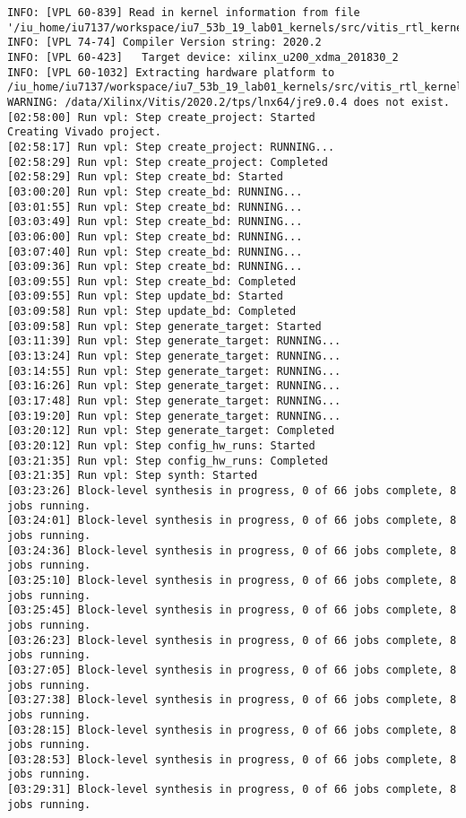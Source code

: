 \begin{center}
\begin{lstlisting}[label=lst:vlog,caption=Файл v++\_vinc.log]
INFO: [VPL 60-839] Read in kernel information from file '/iu_home/iu7137/workspace/iu7_53b_19_lab01_kernels/src/vitis_rtl_kernel/rtl_kernel_wizard_1/_x/link/int/kernel_info.dat'.
INFO: [VPL 74-74] Compiler Version string: 2020.2
INFO: [VPL 60-423]   Target device: xilinx_u200_xdma_201830_2
INFO: [VPL 60-1032] Extracting hardware platform to /iu_home/iu7137/workspace/iu7_53b_19_lab01_kernels/src/vitis_rtl_kernel/rtl_kernel_wizard_1/_x/link/vivado/vpl/.local/hw_platform
WARNING: /data/Xilinx/Vitis/2020.2/tps/lnx64/jre9.0.4 does not exist.
[02:58:00] Run vpl: Step create_project: Started
Creating Vivado project.
[02:58:17] Run vpl: Step create_project: RUNNING...
[02:58:29] Run vpl: Step create_project: Completed
[02:58:29] Run vpl: Step create_bd: Started
[03:00:20] Run vpl: Step create_bd: RUNNING...
[03:01:55] Run vpl: Step create_bd: RUNNING...
[03:03:49] Run vpl: Step create_bd: RUNNING...
[03:06:00] Run vpl: Step create_bd: RUNNING...
[03:07:40] Run vpl: Step create_bd: RUNNING...
[03:09:36] Run vpl: Step create_bd: RUNNING...
[03:09:55] Run vpl: Step create_bd: Completed
[03:09:55] Run vpl: Step update_bd: Started
[03:09:58] Run vpl: Step update_bd: Completed
[03:09:58] Run vpl: Step generate_target: Started
[03:11:39] Run vpl: Step generate_target: RUNNING...
[03:13:24] Run vpl: Step generate_target: RUNNING...
[03:14:55] Run vpl: Step generate_target: RUNNING...
[03:16:26] Run vpl: Step generate_target: RUNNING...
[03:17:48] Run vpl: Step generate_target: RUNNING...
[03:19:20] Run vpl: Step generate_target: RUNNING...
[03:20:12] Run vpl: Step generate_target: Completed
[03:20:12] Run vpl: Step config_hw_runs: Started
[03:21:35] Run vpl: Step config_hw_runs: Completed
[03:21:35] Run vpl: Step synth: Started
[03:23:26] Block-level synthesis in progress, 0 of 66 jobs complete, 8 jobs running.
[03:24:01] Block-level synthesis in progress, 0 of 66 jobs complete, 8 jobs running.
[03:24:36] Block-level synthesis in progress, 0 of 66 jobs complete, 8 jobs running.
[03:25:10] Block-level synthesis in progress, 0 of 66 jobs complete, 8 jobs running.
[03:25:45] Block-level synthesis in progress, 0 of 66 jobs complete, 8 jobs running.
[03:26:23] Block-level synthesis in progress, 0 of 66 jobs complete, 8 jobs running.
[03:27:05] Block-level synthesis in progress, 0 of 66 jobs complete, 8 jobs running.
[03:27:38] Block-level synthesis in progress, 0 of 66 jobs complete, 8 jobs running.
[03:28:15] Block-level synthesis in progress, 0 of 66 jobs complete, 8 jobs running.
[03:28:53] Block-level synthesis in progress, 0 of 66 jobs complete, 8 jobs running.
[03:29:31] Block-level synthesis in progress, 0 of 66 jobs complete, 8 jobs running.

\end{lstlisting}
\end{center}
